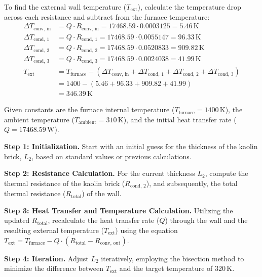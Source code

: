 \documentclass[12pt]{article}
\begin{document}
\noindent
To find the external wall temperature (\(T_{\text{ext}}\)), calculate the temperature drop across each resistance and subtract from the furnace temperature:
\begin{align*}
\Delta T_{\text{conv, in}} &= Q \cdot R_{\text{conv, in}} = 17468.59 \cdot 0.0003125 = 5.46 \, \text{K} \\
\Delta T_{\text{cond, 1}} &= Q \cdot R_{\text{cond, 1}} = 17468.59 \cdot 0.0055147 = 96.33 \, \text{K} \\
\Delta T_{\text{cond, 2}} &= Q \cdot R_{\text{cond, 2}} = 17468.59 \cdot 0.0520833 = 909.82 \, \text{K} \\
\Delta T_{\text{cond, 3}} &= Q \cdot R_{\text{cond, 3}} = 17468.59 \cdot 0.0024038 = 41.99 \, \text{K} \\
T_{\text{ext}} &= T_{\text{furnace}} - (\Delta T_{\text{conv, in}} + \Delta T_{\text{cond, 1}} + \Delta T_{\text{cond, 2}} + \Delta T_{\text{cond, 3}}) \\
&= 1400 - (5.46 + 96.33 + 909.82 + 41.99) \\
&= 346.39 \, \text{K}
\end{align*}

\noindent
Given constants are the furnace internal temperature (\(T_{\text{furnace}} = 1400 \, \text{K}\)), the ambient temperature (\(T_{\text{ambient}} = 310 \, \text{K}\)), and the initial heat transfer rate (\(Q = 17468.59 \, \text{W}\)).
\newline

\textbf{Step 1: Initialization.} Start with an initial guess for the thickness of the kaolin brick, \(L_2\), based on standard values or previous calculations.
\newline

\textbf{Step 2: Resistance Calculation.} For the current thickness \(L_2\), compute the thermal resistance of the kaolin brick (\(R_{\text{cond, 2}}\)), and subsequently, the total thermal resistance (\(R_{\text{total}}\)) of the wall.
\newline

\textbf{Step 3: Heat Transfer and Temperature Calculation.} Utilizing the updated \(R_{\text{total}}\), recalculate the heat transfer rate (\(Q\)) through the wall and the resulting external temperature (\(T_{\text{ext}}\)) using the equation \(T_{\text{ext}} = T_{\text{furnace}} - Q \cdot (R_{\text{total}} - R_{\text{conv, out}})\).
\newline

\textbf{Step 4: Iteration.} Adjust \(L_2\) iteratively, employing the bisection method to minimize the difference between \(T_{\text{ext}}\) and the target temperature of \(320 \, \text{K}\).
\newline
\end{document}
